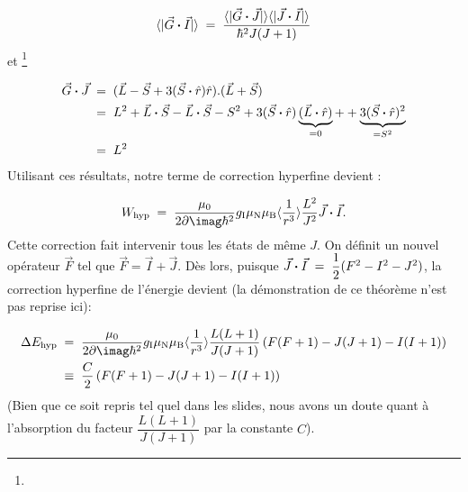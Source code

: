 \[
    \langle |\vec{G}\boldsymbol{\cdot}\vec{I}| \rangle \; = \;  \dfrac{\langle |\vec{G}\boldsymbol{\cdot}\vec{J}| \rangle\langle |\vec{J}\boldsymbol{\cdot}\vec{I}| \rangle}{\hbar^2J(J+1)}
\]
et \footnote{}

\begin{align*}
    \vec{G}\boldsymbol{\cdot}\vec{J}
    &\; = \;  (\vec{L}-\vec{S}+3(\vec{S}\boldsymbol{\cdot}\hat{r})\hat{r}).(\vec{L}+\vec{S})\\
    &\; = \; L^2 + \vec{L}\boldsymbol{\cdot}\vec{S} -\vec{L}\boldsymbol{\cdot}\vec{S} - S^2 + 3 (\vec{S}\boldsymbol{\cdot}\hat{r})\underbrace{(\vec{L}\boldsymbol{\cdot}\hat{r})}_{= 0} + +\underbrace{3(\vec{S}\boldsymbol{\cdot}\hat{r})^2}_{=S^2}\\
    &\; = \;  L^2
\end{align*}
Utilisant ces résultats, notre terme de correction hyperfine devient :

\begin{equation}
    W_\text{hyp} \eq  \dfrac{\mu_0}{2\p\imag\hbar^2}g_\text{I}\mu_\text{N}\mu_\text{B}\langle\dfrac{1}{r^3}\rangle \dfrac{L^2}{J^2}\vec{J}\Cdot\vec{I}.
\end{equation}
Cette correction fait intervenir tous les états de même $J$. On définit un nouvel opérateur $\vec{F}$ tel que $\vec{F} = \vec{I} + \vec{J}$. Dès lors, puisque $\vec{J}\boldsymbol{\cdot}\vec{I} \; = \;  \dfrac{1}{2}(F^2-I^2-J^2)$, la correction hyperfine  de l'énergie devient (la démonstration de ce théorème n'est pas reprise ici):

\begin{align*}
    \Delta E_\text{hyp} &\eq  \dfrac{\mu_0}{2\p\imag\hbar^2}g_\text{I}\mu_\text{N}\mu_\text{B}\langle\dfrac{1}{r^3}\rangle\dfrac{L(L+1)}{J(J+1)}\left( F(F+1) - J(J+1) - I(I+1) \right)\\
    &\;\equiv\;
    \dfrac{C}{2} \left( F(F+1) - J(J+1) - I(I+1) \right)
\end{align*}
(Bien que ce soit repris tel quel dans les slides, nous avons un doute quant à l'absorption du facteur $\dfrac{L(L+1)}{J(J+1)}$ par la constante $C$).

